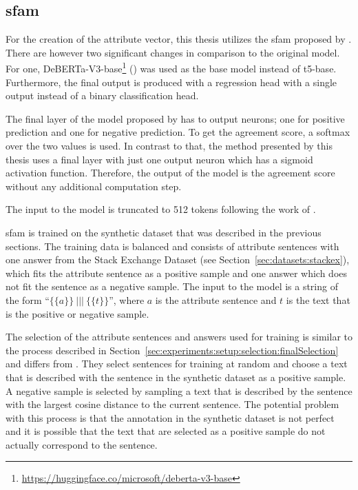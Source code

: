 \subsection{\acf{sfam}}
\label{sec:experiments:setup:sfam}
For the creation of the attribute vector, this thesis utilizes the \acl{sfam} proposed by \citet{patelLearningInterpretableStyle2023}. There are however two significant changes in comparison to the original model. For one, DeBERTa-V3-base\footnote{\url{https://huggingface.co/microsoft/deberta-v3-base}} (\cite{he2021deberta}) was used as the base model instead of t5-base. Furthermore, the final output is produced with a regression head with a single output instead of a binary classification head.

The final layer of the model proposed by \citet{patelLearningInterpretableStyle2023} has to output neurons; one for positive prediction and one for negative prediction. To get the agreement score, a softmax over the two values is used. In contrast to that, the method presented by this thesis uses a final layer with just one output neuron which has a sigmoid activation function. Therefore, the output of the model is the agreement score without any additional computation step.

The input to the model is truncated to 512 tokens following the work of \citet{patelLearningInterpretableStyle2023}.

\acs{sfam} is trained on the synthetic dataset that was described in the previous sections. The training data is balanced and consists of attribute sentences with one answer from the Stack Exchange Dataset (see Section~\ref{sec:datasets:stackex}), which fits the attribute sentence as a positive sample and one answer which does not fit the sentence as a negative sample. The input to the model is a string of the form \enquote{\(\{\{a\}\}~|||~\{\{t\}\}\)}, where \(a\) is the attribute sentence and \(t\) is the text that is the positive or negative sample.

The selection of the attribute sentences and answers used for training is similar to the process described in Section~\ref{sec:experiments:setup:selection:finalSelection} and differs from \citet{patelLearningInterpretableStyle2023}. They select sentences for training at random and choose a text that is described with the sentence in the synthetic dataset as a positive sample. A negative sample is selected by sampling a text that is described by the sentence with the largest cosine distance to the current sentence.
The potential problem with this process is that the annotation in the synthetic dataset is not perfect and it is possible that the text that are selected as a positive sample do not actually correspond to the sentence.

